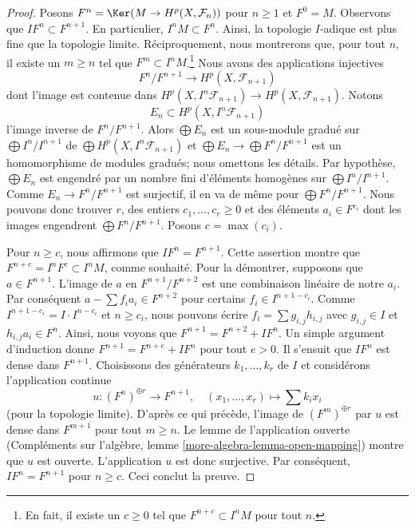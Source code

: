 \begin{proof}

Posons $F^n = \Ker(M \to H^p(X, \mathcal{F}_n))$ pour $n \geq 1$ et $F^0 = M$. Observons que $I F^n \subset F^{n + 1}$. En particulier, $I^n M \subset F^n$. Ainsi, la topologie $I$-adique est plus fine que la topologie limite. Réciproquement, nous montrerons que, pour tout $n$,
il existe un $m \geq n$ tel que $F^m \subset I^nM$.\footnote{En fait, il existe un $c \geq 0$ tel que $F^{n + c} \subset I^nM$ pour tout $n$.} Nous avons des applications injectives
$$
F^n/F^{n + 1} \longrightarrow H^p(X, \mathcal{F}_{n + 1})
$$
dont l'image est contenue dans
$H^p(X, I^n\mathcal{F}_{n + 1}) \to H^p(X, \mathcal{F}_{n + 1})$. Notons
$$
E_n \subset H^p(X, I^n\mathcal{F}_{n + 1})
$$
l'image inverse de $F^n/F^{n + 1}$. Alors $\bigoplus E_n$ est un sous-module gradué sur $\bigoplus I^n/I^{n + 1}$ de
$\bigoplus H^p(X, I^n\mathcal{F}_{n + 1})$ et
$\bigoplus E_n \to \bigoplus F^n/F^{n + 1}$ est un homomorphisme de modules gradués; nous omettons les détails. Par hypothèse, $\bigoplus E_n$ est engendré par un nombre fini d'éléments homogènes sur $\bigoplus I^n/I^{n + 1}$. Comme $E_n \to F^n/F^{n + 1}$ est surjectif, il en va de même pour $\bigoplus F^n/F^{n + 1}$. Nous pouvons donc trouver $r$, des entiers $c_1, \ldots, c_r \geq 0$ et
des éléments $a_i \in F^{c_i}$ dont les images engendrent $\bigoplus F^n/F^{n + 1}$. Posons $c = \max(c_i)$.

\medskip\noindent

Pour $n \geq c$, nous affirmons que $I F^n = F^{n + 1}$. Cette assertion montre que
$F^{n + c} = I^nF^c \subset I^nM$, comme souhaité. Pour la démontrer, supposons que $a \in F^{n + 1}$. L'image de
$a$ en $F^{n + 1}/F^{n + 2}$ est une combinaison linéaire de notre $a_i$. Par conséquent $a  - \sum f_i a_i \in F^{n + 2}$
pour certains $f_i \in I^{n + 1 - c_i}$. Comme
$I^{n + 1 - c_i} = I \cdot I^{n - c_i}$ et $n \geq c_i$, nous pouvons écrire
$f_i = \sum g_{i, j} h_{i, j}$ avec $g_{i, j} \in I$
et $h_{i, j}a_i \in F^n$. Ainsi, nous voyons que
$F^{n + 1} = F^{n + 2} + IF^n$. Un simple argument d'induction donne $F^{n + 1} = F^{n + e} + IF^n$
pour tout $e > 0$. Il s'ensuit que $IF^n$ est dense dans $F^{n + 1}$. Choisissons des générateurs $k_1, \ldots, k_r$ de $I$ et considérons l'application continue
$$
u : (F^n)^{\oplus r} \longrightarrow F^{n + 1},\quad
(x_1, \ldots, x_r) \mapsto \sum k_i x_i
$$
(pour la topologie limite). D'après ce qui précède, l'image de $(F^m)^{\oplus r}$ par $u$ est dense dans
$F^{m + 1}$ pour tout $m \geq n$. Le lemme de l'application ouverte (Compléments sur l'algèbre, lemme \ref{more-algebra-lemma-open-mapping}) montre que $u$ est ouverte. L'application $u$ est donc surjective. Par conséquent, $IF^n = F^{n + 1}$
pour $n \geq c$. Ceci conclut la preuve.

\end{proof}

